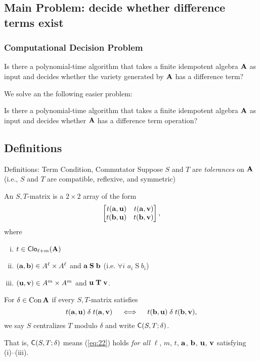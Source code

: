 \documentclass[12pt,xcolor=dvipsnames%
   ]{beamer}
\newcommand{\defin}[1]{\alert{#1}}
\begin{document}
\subsection{Main Problem: decide whether difference terms exist}

\begin{frame}
  \frametitle{Computational Decision Problem}
  \begin{problem}[1]
  \label{prob:1}
  Is there a polynomial-time algorithm that takes a finite
  idempotent algebra $\mathbf{A}$ as input and decides whether the variety generated by
  $\mathbf{A}$ has a difference term?
\end{problem}

We solve an the following easier problem:
\begin{problem}[2]
  \label{prob:2}
  Is there a polynomial-time algorithm that takes a finite
  idempotent algebra $\mathbf{A}$ as input and decides whether 
  $\mathbf{A}$ has a difference term operation?
\end{problem}
\end{frame}




\subsection{Definitions}

\begin{frame}{Definitions: Term Condition, Commutator}
  Suppose $S$ and $T$ are \emph{tolerances} on $\mathbf{A}$\\[4pt]
  {\small (i.e., $S$ and $T$ are compatible, reflexive, and symmetric)}

  \pause
  An \defin{$S,T$-matrix} is a $2\times 2$ array of the form
  \[
  \begin{bmatrix*}[r] t(\ba,\bu) & t(\ba,\bv)\\ t(\bb,\bu)&t(\bb,\bv)\end{bmatrix*},
  \]
  where 
  \begin{enumerate}[(i)] %
  \item $t\in \operatorname{\mathsf{Clo}}_{\ell + m}(\mathbf{A})$
  \item $(\mathbf{a}, \mathbf{b})\in A^\ell\times A^\ell$ and $\mathbf{a} \mathrel{\mathbf{S}} \mathbf{b}$
    (i.e. $\forall i$ $a_i \mathrel{S} b_i$)
  \item $(\mathbf{u}, \mathbf{v})\in A^m\times A^m$ and $\mathbf{u} \mathrel{\mathbf{T}} \mathbf{v}$.
  \end{enumerate}

  \pause
  For $\delta \in \operatorname{Con}\mathbf{A}$ if every $S,T$-matrix satisfies
  \begin{equation}
    \label{eq:22}
    t(\mathbf{a},\mathbf{u}) \mathrel{\delta} t(\mathbf{a},\mathbf{v})\quad \iff \quad t(\mathbf{b},\mathbf{u}) \mathrel{\delta} t(\mathbf{b},\mathbf{v}),
  \end{equation}
  we say \defin{$S$ centralizes $T$ modulo $\delta$} and write 
  $\mathsf{C}(S, T; \delta)$.

  That is, $\mathsf{C}(S, T; \delta)$  means
  (\ref{eq:22}) holds \emph{for all}
  $\ell$, $m$, $t$, $\mathbf{a}$, $\mathbf{b}$, $\mathbf{u}$, $\mathbf{v}$ satisfying (i)--(iii).
\end{frame}
\end{document}
